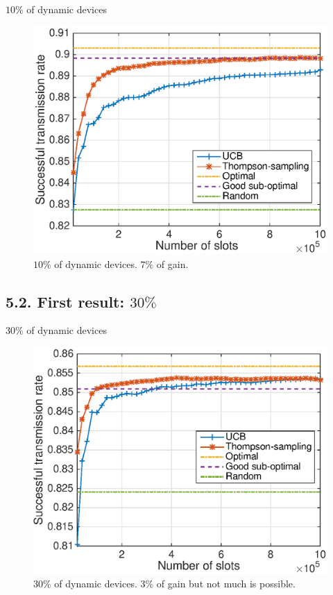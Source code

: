 \documentclass[12pt,english,ignorenonframetext,aspectratio=169,]{beamer}
\begin{document}
\begin{frame}{\(10\%\) of dynamic devices}

\begin{figure}[h!]
\centering
\includegraphics[height=0.74\textheight]{10intelligent.eps}
\caption{\small{$10\%$ of dynamic devices. $7\%$ of gain.}}
\end{figure}

\end{frame}



\subsection{\hfill{}5.2. First result: $30\%$\hfill{}}

\begin{frame}{\(30\%\) of dynamic devices}

\begin{figure}[h!]
\centering
\includegraphics[height=0.74\textheight]{30intelligent.eps}
\caption{\small{$30\%$ of dynamic devices.} $3\%$ of gain but not much is possible.}
\end{figure}

\end{frame}
\end{document}
